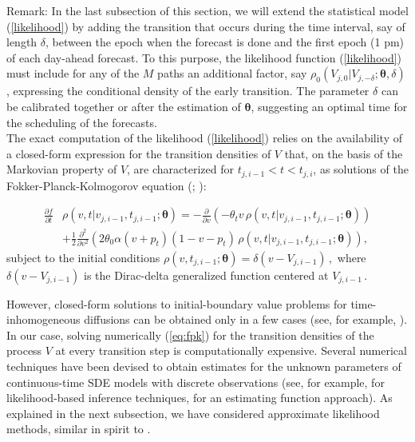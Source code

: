 \documentclass[11pt]{article}
\theoremstyle{definition}
\begin{document}
Remark: In the last subsection of this section, we will extend the statistical model (\ref{likelihood}) by adding the transition that occurs during the time interval, say of length $\delta$, between the epoch when the forecast is done and the first epoch (1 pm) of each day-ahead forecast. 
To this purpose, the likelihood function (\ref{likelihood}) must include for any of the $M$ paths an additional factor, say $\rho_0 (V_{j, 0}|V_{j, -\delta};\bm{\theta},\delta)$, expressing the conditional density of the early transition. The parameter $\delta$ can be calibrated together or after the estimation of $\bm{\theta}$, suggesting an optimal time for the scheduling of the forecasts.\\
 
The exact computation of the likelihood (\ref{likelihood}) relies on the availability of a closed-form expression for the transition densities of $V$ that, on the basis of the Markovian property of $V$, are characterized for $ t_{j, i-1} < t < t_{j,i}$,  as solutions of the Fokker-Planck-Kolmogorov equation (\cite[36]{iacus1}; \cite[61-68]{saso}):

\begin{align}
\frac{ \partial f }{\partial t } & \rho(v ,t \vert v_{j,i-1} ,  t_{j,i-1} ; \bm{\theta} )= - \frac{\partial}{ \partial v} (- \theta_t v \, \rho(v ,t \vert v_{j,i-1} ,  t_{j,i-1} ; \bm{\theta} ) ) \nonumber \\
& + \frac{1}{2} \frac{\partial^2}{ \partial v^2} ( 2 \theta_0 \alpha (v+ p_t) (1 - v- p_t) \, \rho(v ,t \vert v_{j,i-1} ,  t_{j,i-1} ; \bm{\theta} ) ),  \label{eq:fpk}
\end{align}
subject to the initial conditions $\rho(v , t_{j, i-1} ; \bm{\theta} ) = \delta(v - V_{j, i-1}) \,,$ where $ \delta(v - V_{j, i-1})$ is the Dirac-delta generalized function centered at $ V_{j, i-1}\,.$

However, closed-form solutions to initial-boundary value problems for time-inhomogeneous diffusions can be obtained only in a few cases (see, for example, \cite[Section 3.1]{eglix}). In our case, solving numerically (\ref{eq:fpk}) for the transition densities of the process $V$ at every transition step is computationally expensive. 
Several numerical techniques have been devised to obtain estimates for the unknown parameters of continuous-time SDE models with discrete observations (see, for example, \cite{prewo} for likelihood-based inference techniques, \cite{Sor} for an estimating function approach). As explained in the next subsection, we have considered approximate likelihood methods, similar in spirit to \autocite[Section 11.4]{saso}.
\end{document}
